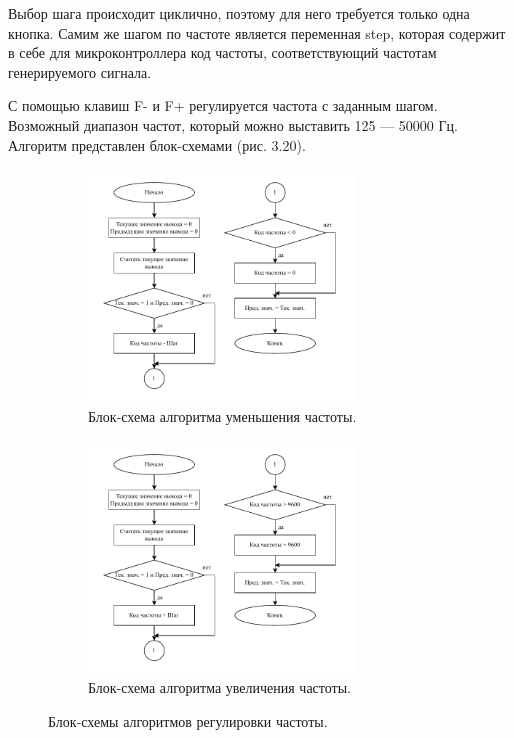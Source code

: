	Выбор шага происходит циклично, поэтому для него требуется только одна кнопка. Самим же шагом по частоте является переменная step, которая содержит в себе для микроконтроллера код частоты, соответствующий частотам генерируемого сигнала.
	
	С помощью клавиш F- и F+ регулируется частота с заданным шагом. Возможный диапазон частот, который можно выставить 125 --- 50000 Гц. Алгоритм представлен блок-схемами (рис. 3.20).
	
	\begin{figure}[H]\captionsetup[subfigure]{font=normalsize}
     \begin{subfigure}[H]{1\textwidth}
         \centering
         \includegraphics[width=0.775\textwidth]{../image/minus_freq.pdf}
         \caption{Блок-схема алгоритма уменьшения частоты.}
     \end{subfigure}
     \hfill
     \begin{subfigure}[H]{1\textwidth}
         \centering
         \includegraphics[width=0.775\textwidth]{../image/plus_freq.pdf}
         \caption{Блок-схема алгоритма увеличения частоты.}
     \end{subfigure}
        \caption{Блок-схемы алгоритмов регулировки частоты.}
	\end{figure}
	
